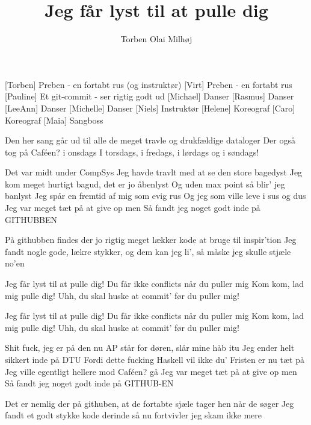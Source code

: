 \documentclass[a4paper,11pt]{article}
\title{Jeg får lyst til at pulle dig}
\author{Torben Olai Milhøj}
\begin{document}
\maketitle

\begin{roles}
  [Torben] Preben - en fortabt rus (og instruktør)
  [Virt] Preben - en fortabt rus
  [Pauline] Et git-commit - ser rigtig godt ud
  [Michael] Danser
  [Rasmus] Danser
  [LeeAnn] Danser
  [Michelle] Danser
  [Niels] Instruktør
  [Helene] Koreograf
  [Caro] Koreograf
  [Maia] Sangboss
\end{roles}

\begin{song}
  Den her sang går ud til alle de meget travle og drukfældige dataloger
  Der også tog på Caféen? i onsdags
  I torsdags, i fredags, i lørdags og i søndags!

  Det var midt under CompSys
  Jeg havde travlt med at se den store bagedyst
  Jeg kom meget hurtigt bagud, det er jo åbenlyst
  Og uden max point så blir' jeg banlyst
  Jeg spår en fremtid af mig som evig rus
  Og jeg som ville leve i sus og dus
  Jeg var meget tæt på at give op men
  Så fandt jeg noget godt inde på GITHUBBEN

  På githubben findes der jo rigtig meget lækker kode at bruge til inspir'tion
  Jeg fandt nogle gode, lækre stykker, og dem kan jeg li', så måske jeg skulle stjæle no'en

   Jeg får lyst til at pulle dig!
   Du får ikke conflicts når du puller mig
   Kom kom, lad mig pulle dig!
   Uhh, du skal huske at commit' før du puller mig!

   Jeg får lyst til at pulle dig!
   Du får ikke conflicts når du puller mig
   Kom kom, lad mig pulle dig!
   Uhh, du skal huske at commit' før du puller mig!

  Shit fuck, jeg er på den nu
  AP står for døren, slår mine håb itu
  Jeg ender helt sikkert inde på DTU
  Fordi dette fucking Haskell vil ikke du'
  Fristen er nu tæt på
  Jeg ville egentligt hellere mod Caféen? gå
  Jeg var meget tæt på at give op men
  Så fandt jeg noget godt inde på GITHUB-EN

  Det er nemlig der på githuben, at de fortabte sjæle tager hen
  når de søger
  Jeg fandt et godt stykke kode derinde så nu fortvivler jeg skam
  ikke mere


\end{song}
\end{document}
